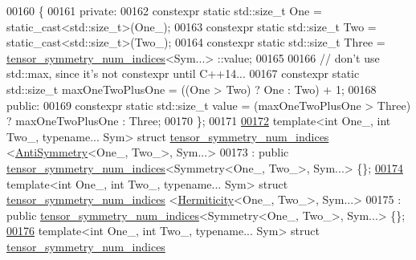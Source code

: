 \begin{DoxyCode}
00160 \{
00161 \textcolor{keyword}{private}:
00162   constexpr \textcolor{keyword}{static} std::size\_t One = \textcolor{keyword}{static\_cast<}std::size\_t\textcolor{keyword}{>}(One\_);
00163   constexpr \textcolor{keyword}{static} std::size\_t Two = \textcolor{keyword}{static\_cast<}std::size\_t\textcolor{keyword}{>}(Two\_);
00164   constexpr \textcolor{keyword}{static} std::size\_t Three = \hyperlink{struct_eigen_1_1internal_1_1tensor__symmetry__num__indices}{tensor\_symmetry\_num\_indices}<Sym...>
      ::value;
00165 
00166   \textcolor{comment}{// don't use std::max, since it's not constexpr until C++14...}
00167   constexpr \textcolor{keyword}{static} std::size\_t maxOneTwoPlusOne = ((One > Two) ? One : Two) + 1;
00168 \textcolor{keyword}{public}:
00169   constexpr \textcolor{keyword}{static} std::size\_t value = (maxOneTwoPlusOne > Three) ? maxOneTwoPlusOne : Three;
00170 \};
00171 
\hyperlink{struct_eigen_1_1internal_1_1tensor__symmetry__num__indices_3_01_anti_symmetry_3_01_one___00_01_two___01_4_00_01_sym_8_8_8_01_4}{00172} \textcolor{keyword}{template}<\textcolor{keywordtype}{int} One\_, \textcolor{keywordtype}{int} Two\_, \textcolor{keyword}{typename}... Sym> \textcolor{keyword}{struct }\hyperlink{struct_eigen_1_1internal_1_1tensor__symmetry__num__indices}{tensor\_symmetry\_num\_indices}
      <\hyperlink{struct_eigen_1_1_anti_symmetry}{AntiSymmetry}<One\_, Two\_>, Sym...>
00173   : \textcolor{keyword}{public} \hyperlink{struct_eigen_1_1internal_1_1tensor__symmetry__num__indices}{tensor\_symmetry\_num\_indices}<Symmetry<One\_, Two\_>, Sym...> \{\};
\hyperlink{struct_eigen_1_1internal_1_1tensor__symmetry__num__indices_3_01_hermiticity_3_01_one___00_01_two___01_4_00_01_sym_8_8_8_01_4}{00174} \textcolor{keyword}{template}<\textcolor{keywordtype}{int} One\_, \textcolor{keywordtype}{int} Two\_, \textcolor{keyword}{typename}... Sym> \textcolor{keyword}{struct }\hyperlink{struct_eigen_1_1internal_1_1tensor__symmetry__num__indices}{tensor\_symmetry\_num\_indices}
      <\hyperlink{struct_eigen_1_1_hermiticity}{Hermiticity}<One\_, Two\_>, Sym...>
00175   : \textcolor{keyword}{public} \hyperlink{struct_eigen_1_1internal_1_1tensor__symmetry__num__indices}{tensor\_symmetry\_num\_indices}<Symmetry<One\_, Two\_>, Sym...> \{\};
\hyperlink{struct_eigen_1_1internal_1_1tensor__symmetry__num__indices_3_01_anti_hermiticity_3_01_one___00_00182a5a3b195af54d2fe6bb829d4e663}{00176} \textcolor{keyword}{template}<\textcolor{keywordtype}{int} One\_, \textcolor{keywordtype}{int} Two\_, \textcolor{keyword}{typename}... Sym> \textcolor{keyword}{struct }\hyperlink{struct_eigen_1_1internal_1_1tensor__symmetry__num__indices}{tensor\_symmetry\_num\_indices}

\end{DoxyCode}
